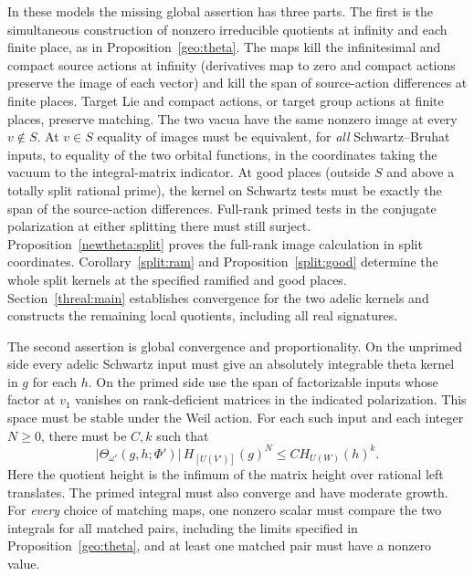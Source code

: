 In these models the missing global assertion has three parts.
The first is the simultaneous construction of nonzero irreducible
quotients at infinity and each finite place, as in
Proposition~\ref{geo:theta}. The maps kill the infinitesimal and compact
source actions at infinity (derivatives map to zero and compact actions
preserve the image of each vector) and kill the span of source-action
differences at finite places. Target Lie and compact actions, or target
group actions at finite places, preserve matching. The two vacua have
the same nonzero image at every \(v\notin S\). At \(v\in S\) equality
of images must be equivalent, for \emph{all} Schwartz--Bruhat inputs,
to equality of the two orbital functions, in the coordinates taking the
vacuum to the integral-matrix indicator. At good places (outside \(S\)
and above a totally split rational prime), the kernel on Schwartz tests
must be exactly the span of the source-action differences. Full-rank
primed tests in the conjugate polarization at either splitting there
must still surject. Proposition~\ref{newtheta:split} proves the
full-rank image calculation in split coordinates. Corollary~\ref{split:ram}
and Proposition~\ref{split:good} determine the whole split kernels at
the specified ramified and good places. Section~\ref{threal:main}
establishes convergence for the two adelic kernels and constructs the
remaining local quotients, including all real signatures.

The second assertion is global convergence and proportionality. On the
unprimed side every adelic Schwartz input must give an absolutely
integrable theta kernel in \(g\) for each \(h\). On the primed side
use the span of factorizable inputs whose factor at \(v_1\) vanishes
on rank-deficient matrices in the indicated polarization. This space
must be stable under the Weil action. For each such input and each
integer \(N\ge0\), there must be \(C,k\) such that
\[
 |\Theta_{\omega'}(g,h;\Phi')|\,H_{[U(V')]}(g)^N
                 \le C H_{U(W)}(h)^k .
\]
Here the quotient height is the infimum of the matrix height over
rational left translates. The primed integral must also converge and
have moderate growth. For \emph{every} choice of matching maps, one
nonzero scalar must compare the two integrals for all matched pairs,
including the limits specified in Proposition~\ref{geo:theta}, and
at least one matched pair must have a nonzero value.

